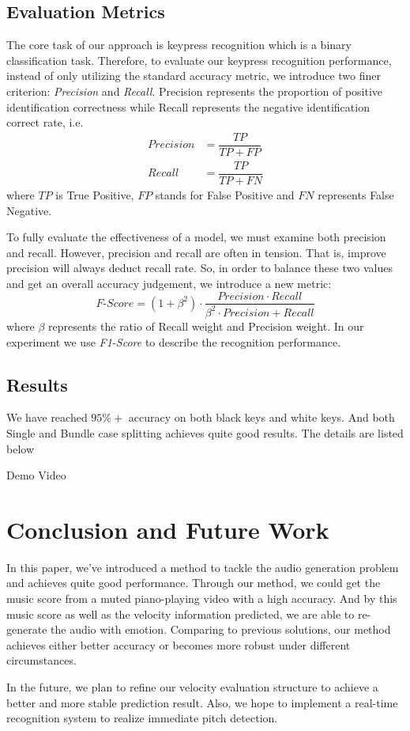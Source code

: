 \documentclass[10pt,twocolumn,letterpaper]{article}
\begin{document}
\subsection{Evaluation Metrics}
   The core task of our approach is keypress recognition which is a binary classification task.
   Therefore, to evaluate our keypress recognition performance, instead of only utilizing the standard accuracy metric, we introduce two finer criterion: \textit{Precision} and \textit{Recall}.
   Precision represents the proportion of positive identification correctness while Recall represents the negative identification correct rate, i.e.
   \begin{align*}
      Precision &= \dfrac{TP}{TP+FP}\\
      Recall &= \dfrac{TP}{TP+FN}
   \end{align*}
   where $TP$ is True Positive, $FP$ stands for False Positive and $FN$ represents False Negative.

   To fully evaluate the effectiveness of a model, we must examine both precision and recall.
   However, precision and recall are often in tension. That is, improve precision will always deduct recall rate.
   So, in order to balance these two values and get an overall accuracy judgement, we introduce a new metric:
   $$\textit{F-Score} = (1+\beta^2)\cdot\dfrac{Precision\cdot Recall}{\beta^2\cdot Precision + Recall}$$
   where $\beta$ represents the ratio of Recall weight and Precision weight.
   In our experiment we use \textit{F1-Score} to describe the recognition performance.

\subsection{Results}

We have reached \(95\%+\) accuracy on both black keys and white keys. 
And both Single and Bundle case splitting achieves quite good results.
The details are listed below


Demo Video

\section{Conclusion and Future Work}

In this paper, we've introduced a method to tackle the audio generation problem and achieves quite good performance.
Through our method, we could get the music score from a muted piano-playing video with a high accuracy.
And by this music score as well as the velocity information predicted, we are able to re-generate the audio with emotion.
Comparing to previous solutions, our method achieves either better accuracy or becomes more robust under different circumstances.

In the future, we plan to refine our velocity evaluation structure to achieve a better and more stable prediction result.
Also, we hope to implement a real-time recognition system to realize immediate pitch detection.


{\small


}
\end{document}
